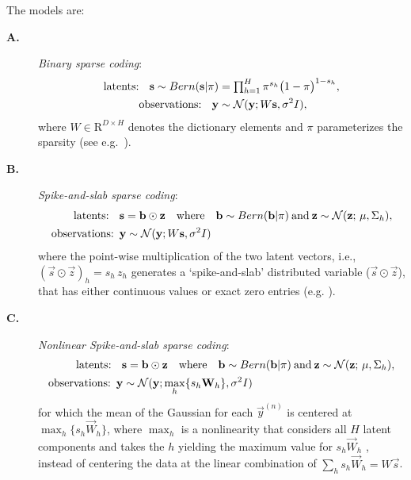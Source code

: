 The models are:
%
\begin{description}
\item[\textbf{A.}] \textit{Binary sparse coding}:
%
\vspace{-.1cm}
\begin{align}
\text{latents: } \,\,\,\vec{s} \sim Bern(\vec{s} | \pi) &= \disT\prod_{h=1}^H \pi^{s_h} \big( 1 - \pi \big)^{1-s_h},\nonumber \\
\text{observations:  }\,\,\,    \vec{y} &\sim \mathcal{N}(\vec{y}; W\vec{s}, \sigma^2\One),\nonumber%
\end{align}
%
where $W \in \mathrm{R}^{D \times H}$ denotes the dictionary elements and $\pi$ parameterizes the sparsity (see e.g.~\citep{HennigesEtAl2010}).
\item[\textbf{B.}] \textit{Spike-and-slab sparse coding}:
\vspace{-.2cm}
\begin{align}
\text{latents: } & \,\,\,\vec{s} = \vec{b}\odot\vec{z}
\quad\mathrm{where}\quad \vec{b}\sim Bern(\vec{b} | \pi)
\:\mathrm{and} \:
\vec{z} \sim \mathcal{N}(\vec{z};\,\vec{\mu} , \Sigma_h),\nonumber\\
\text{observations:} & \,\,\, \vec{y} \sim \mathcal{N}(\vec{y}; W\vec{s}, \sigma^2\One)\nonumber%
\end{align}
where the point-wise multiplication of the two latent vectors, i.e., $(\vec{s}\odot\vec{z})_h = s_h\,z_h$
generates a `spike-and-slab' distributed variable ($\vec{s}\odot\vec{z}$), that has either continuous values or exact zero entries (e.g. \citep{TitsiasGredilla2011,GoodfellowEtAl2013,SheikhEtAl2014}).
%
\item[\textbf{C.}] \textit{Nonlinear Spike-and-slab sparse coding}:
\vspace{-.2cm}
\begin{align}\label{eq:ssmca}
\text{latents: } & \,\,\,{\mathbf{s}} = {\mathbf{b}}\odot{\mathbf{z}}
\quad\mathrm{where}\quad {\mathbf{b}}\sim Bern({\mathbf{b}} | \pi)
\:\mathrm{and} \:
{\mathbf{z}} \sim \mathcal{N}({\mathbf{z}};\,{\mathbf{\mu}} , \Sigma_h),\nonumber\\
 \text{observations:}\,\,\, &{\mathbf{y}} \sim \mathcal{N}({\mathbf{y}}; \max_{h}\{s_h{\mathbf{W}}_{h}\}, \sigma^2I)\nonumber
\end{align}
for which the mean of the Gaussian for each $\vec{y}^{(n)}$ is centered at $\max_{h}\{s_h\vec{W}_{h}\}$, where $\max_{h}$ is a nonlinearity that considers all $H$ latent components and takes the $h$ yielding the maximum value for $s_h\vec{W}_{h}$ \citep{LuckeSahani2008,SheltonEtAl2012,BornscheinEtAl2013,SheltonEtAl2015}, instead of centering the data at the linear combination of $\sum_h s_h\vec{W}_h=W\vec{s}$.
%
\end{description}

